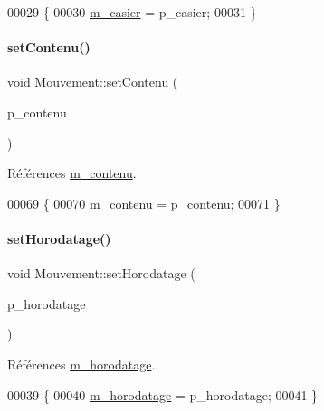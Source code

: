 \begin{DoxyCode}
00029 \{
00030     \hyperlink{class_mouvement_a186f483cf82ff2866da1e10031838567}{m\_casier} = p\_casier;
00031 \}
\end{DoxyCode}
\mbox{\label{class_mouvement_a07e3d77c7d7af6a74e3ac5e7eb195ff9}} 
\paragraph{\texorpdfstring{set\+Contenu()}{setContenu()}}
{\footnotesize\ttfamily void Mouvement\+::set\+Contenu (\begin{DoxyParamCaption}\item[{Q\+String}]{p\+\_\+contenu }\end{DoxyParamCaption})}



Références \hyperlink{class_mouvement_a631b133243576c36fec6e1912415d7d6}{m\+\_\+contenu}.


\begin{DoxyCode}
00069 \{
00070     \hyperlink{class_mouvement_a631b133243576c36fec6e1912415d7d6}{m\_contenu} = p\_contenu;
00071 \}
\end{DoxyCode}
\mbox{\label{class_mouvement_ab0bd90180d06f2ed37fb2b796f31aeb8}} 
\paragraph{\texorpdfstring{set\+Horodatage()}{setHorodatage()}}
{\footnotesize\ttfamily void Mouvement\+::set\+Horodatage (\begin{DoxyParamCaption}\item[{Q\+String}]{p\+\_\+horodatage }\end{DoxyParamCaption})}



Références \hyperlink{class_mouvement_a24f34a74c17068f6c98635400862adcd}{m\+\_\+horodatage}.


\begin{DoxyCode}
00039 \{
00040     \hyperlink{class_mouvement_a24f34a74c17068f6c98635400862adcd}{m\_horodatage} = p\_horodatage;
00041 \}
\end{DoxyCode}
\mbox{\label{class_mouvement_a5c7f0e876b2292627e9d1bef12de03a3}} 
